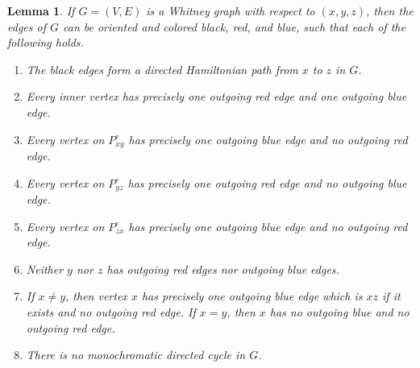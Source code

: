 \documentclass[a4paper,10pt]{article}
\theoremstyle{plain}
\newtheorem{lem}[thm]{Lemma}
\newcommand{\inner}[1]{{#1}^{\circ}}
\begin{document}
\begin{lem}\label{lem:Whitney}
 If $G = (V,E)$ is a Whitney graph with respect to $(x,y,z)$, then the edges of $G$ can be oriented and colored black, red, and blue, such that each of the following holds.
 \begin{enumerate}[label = (\arabic*)]
  \itemsep0pt
  \item The black edges form a directed Hamiltonian path from $x$ to $z$ in $G$.\label{enum:hamil-path}

  \item Every inner vertex has precisely one outgoing red edge and one outgoing blue edge.\label{enum:inner-two}

  \item Every vertex on $\inner{P}_{xy}$ has precisely one outgoing blue edge and no outgoing red edge.\label{enum:xy-blue}

  \item Every vertex on $\inner{P}_{yz}$ has precisely one outgoing red edge and no outgoing blue edge.\label{enum:yz-red}

  \item Every vertex on $\inner{P}_{zx}$ has precisely one outgoing blue edge and no outgoing red edge.\label{enum:zx-blue}

  \item Neither $y$ nor $z$ has outgoing red edges nor outgoing blue edges.\label{enum:y-z-no}

  \item If $x \neq y$, then vertex $x$ has precisely one outgoing blue edge which is $xz$ if it exists and no outgoing red edge.
   If $x=y$, then $x$ has no outgoing blue and no outgoing red edge.\label{enum:x}

  \item There is no monochromatic directed cycle in $G$.\label{enum:acyclic}
 \end{enumerate}
\end{lem}
% 
\end{document}
